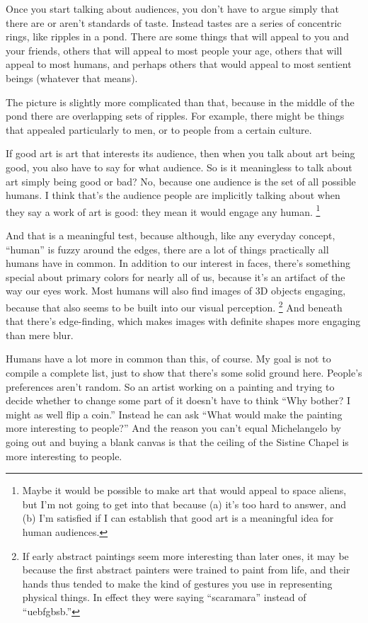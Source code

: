 \documentclass[12pt]{book}
\begin{document}
Once you start talking about audiences, you don't have to argue simply
that there are or aren't standards of taste. Instead tastes are a series
of concentric rings, like ripples in a pond. There are some things that
will appeal to you and your friends, others that will appeal to most
people your age, others that will appeal to most humans, and perhaps
others that would appeal to most sentient beings (whatever that means).

The picture is slightly more complicated than that, because in the
middle of the pond there are overlapping sets of ripples. For example,
there might be things that appealed particularly to men, or to people
from a certain culture.

If good art is art that interests its audience, then when you talk about
art being good, you also have to say for what audience. So is it
meaningless to talk about art simply being good or bad? No, because one
audience is the set of all possible humans. I think that's the audience
people are implicitly talking about when they say a work of art is good:
they mean it would engage any human. \footnote{Maybe it would be possible to make art that would appeal to
space aliens, but I'm not going to get into that because (a) it's too
hard to answer, and (b) I'm satisfied if I can establish that good art
is a meaningful idea for human audiences.}

And that is a meaningful test, because although, like any everyday
concept, ``human'' is fuzzy around the edges, there are a lot of things
practically all humans have in common. In addition to our interest in
faces, there's something special about primary colors for nearly all of
us, because it's an artifact of the way our eyes work. Most humans will
also find images of 3D objects engaging, because that also seems to be
built into our visual perception. \footnote{If early abstract paintings seem more interesting than later
ones, it may be because the first abstract painters were trained to
paint from life, and their hands thus tended to make the kind of
gestures you use in representing physical things. In effect they were
saying ``scaramara'' instead of ``uebfgbsb.''} And beneath
that there's edge-finding, which makes images with definite shapes more
engaging than mere blur.

Humans have a lot more in common than this, of course. My goal is not to
compile a complete list, just to show that there's some solid ground
here. People's preferences aren't random. So an artist working on a
painting and trying to decide whether to change some part of it doesn't
have to think ``Why bother? I might as well flip a coin.'' Instead he
can ask ``What would make the painting more interesting to people?'' And
the reason you can't equal Michelangelo by going out and buying a blank
canvas is that the ceiling of the Sistine Chapel is more interesting to
people.
\end{document}
